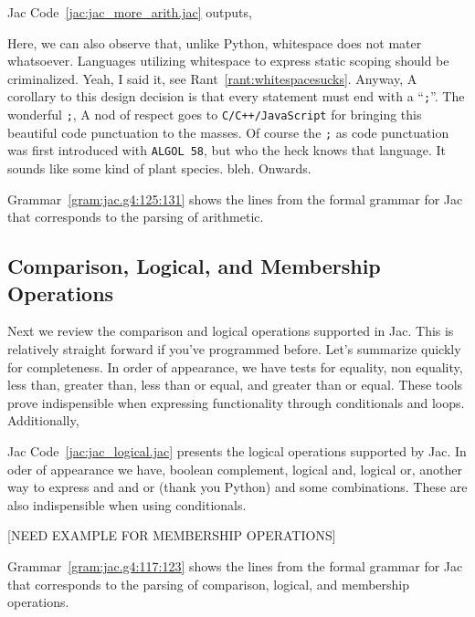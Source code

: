 
Jac Code~\ref{jac:jac_more_arith.jac} outputs,


Here, we can also observe that, unlike Python, whitespace does not mater whatsoever. Languages utilizing whitespace to express static scoping should be criminalized. Yeah, I said it, see Rant~\ref{rant:whitespacesucks}. Anyway, A corollary to this design decision is that every statement must end with a ``\texttt{;}''. The wonderful \texttt{;}, A nod of respect goes to \texttt{C/C++/JavaScript} for bringing this beautiful code punctuation to the masses. Of course the \texttt{;} as code punctuation was first introduced with \texttt{ALGOL 58}, but who the heck knows that language. It sounds like some kind of plant species. \Gls{bleh}. Onwards.

\begin{nerd}
    Grammar~\ref{gram:jac.g4:125:131} shows  the lines from the formal grammar for Jac that corresponds to the parsing of arithmetic.
\end{nerd}

\subsection{Comparison, Logical, and Membership Operations}
Next we review the comparison and logical operations supported in Jac. This is relatively straight forward if you've programmed before. Let's summarize quickly for completeness.
In order of appearance, we have tests for equality, non equality, less than, greater than, less than or equal, and greater than or equal. These tools prove indispensible when expressing functionality through conditionals and loops. Additionally,

Jac Code~\ref{jac:jac_logical.jac} presents the logical operations supported by Jac. In oder of appearance we have, boolean complement, logical and, logical or, another way to express and and or (thank you Python) and some combinations. These are also indispensible when using conditionals.

[NEED EXAMPLE FOR MEMBERSHIP OPERATIONS]

\begin{nerd}
    Grammar~\ref{gram:jac.g4:117:123} shows the lines from the formal grammar for Jac that corresponds to the parsing of comparison, logical, and membership operations.
\end{nerd}

